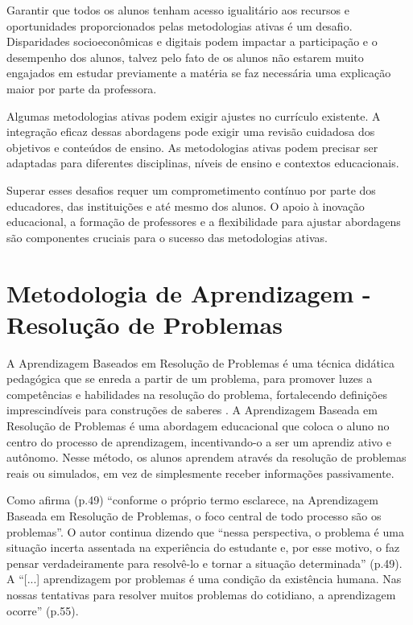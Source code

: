 Garantir que todos os alunos tenham acesso igualitário aos recursos e oportunidades proporcionados pelas metodologias ativas é um desafio. Disparidades socioeconômicas e digitais podem impactar a participação e o desempenho dos alunos, talvez pelo fato de os alunos não estarem muito engajados em estudar previamente a matéria se faz necessária uma explicação maior por parte da professora.

Algumas metodologias ativas podem exigir ajustes no currículo existente. A integração eficaz dessas abordagens pode exigir uma revisão cuidadosa dos objetivos e conteúdos de ensino. As metodologias ativas podem precisar ser adaptadas para diferentes disciplinas, níveis de ensino e contextos educacionais.

Superar esses desafios requer um comprometimento contínuo por parte dos educadores, das instituições e até mesmo dos alunos. O apoio à inovação educacional, a formação de professores e a flexibilidade para ajustar abordagens são componentes cruciais para o sucesso das metodologias ativas.

\section{Metodologia de Aprendizagem - Resolução de Problemas}

A Aprendizagem Baseados em Resolução de Problemas é uma técnica didática pedagógica que se enreda a partir de um problema, para promover luzes a competências e habilidades na resolução do problema, fortalecendo definições imprescindíveis para construções de saberes \cite{SILVA-LINS-LEAO2019}. A Aprendizagem Baseada em Resolução de Problemas é uma abordagem educacional que coloca o aluno no centro do processo de aprendizagem, incentivando-o a ser um aprendiz ativo e autônomo. Nesse método, os alunos aprendem através da resolução de problemas reais ou simulados, em vez de simplesmente receber informações passivamente.

Como afirma  (p.49) ``conforme o próprio termo esclarece, na Aprendizagem Baseada em Resolução de Problemas, o foco central de todo processo são os problemas''. O autor continua dizendo que ``nessa perspectiva, o problema é uma situação incerta assentada na experiência do estudante e, por esse motivo, o faz pensar verdadeiramente para resolvê-lo e tornar a situação determinada'' (p.49). A ``[...] aprendizagem por problemas é uma condição da existência humana. Nas nossas tentativas para resolver muitos problemas do cotidiano, a aprendizagem ocorre'' \cite{SOUZA2016} (p.55).

